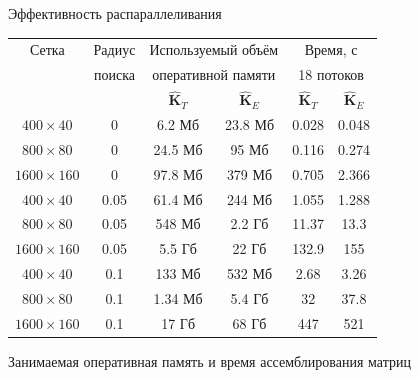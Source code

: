 \begin{frame}{Эффективность распараллеливания}
\tiny
\begin{center}
	\centering
	\begin{tabular}{|c|c|c|c|c|c|}
	\hline
	Сетка & Радиус & \multicolumn{2}{c|}{Используемый объём}   & \multicolumn{2}{c|}{Время, с} \\
	      & поиска & \multicolumn{2}{c|}{оперативной памяти} & \multicolumn{2}{c|}{18 потоков} \\
	\hhline{~~----}
	      &        & $\widehat{\textbf{K}}_T$ & $\widehat{\textbf{K}}_E$ & $\widehat{\textbf{K}}_T$ & $\widehat{\textbf{K}}_E$ \\
	\hline
	$400 \times 40$   & 0    & 6.2 Мб  & 23.8 Мб  & 0.028 & 0.048 \\
	\hline
	$800 \times 80$   & 0    & 24.5 Мб & 95 Мб    & 0.116 & 0.274 \\
	\hline
	$1600 \times 160$ & 0    & 97.8 Мб & 379 Мб   & 0.705 & 2.366 \\
	\hline
	$400 \times 40$   & 0.05 & 61.4 Мб & 244 Мб   & 1.055 & 1.288 \\
	\hline
	$800 \times 80$   & 0.05 & 548 Мб  & 2.2 Гб   & 11.37 & 13.3  \\
	\hline
	$1600 \times 160$ & 0.05 & 5.5 Гб  & 22 Гб    & 132.9 & 155   \\
	\hline
	$400 \times 40$   & 0.1  & 133 Мб  & 532 Мб   & 2.68  & 3.26  \\
	\hline
	$800 \times 80$   & 0.1  & 1.34 Мб & 5.4 Гб   & 32    & 37.8  \\
	\hline
	$1600 \times 160$ & 0.1  & 17 Гб   & 68 Гб    & 447   & 521   \\
	\hline
	\end{tabular}
	
	\normalsize
	Занимаемая оперативная память и время ассемблирования матриц
\end{center}
\end{frame}


